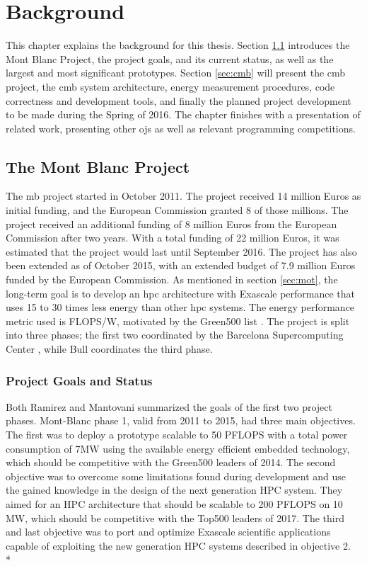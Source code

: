 \chapter{Background}
\label{ch:background}
This chapter explains the background for this thesis. Section \ref{sec:mbp} introduces the Mont Blanc Project, the project goals, and its current status, as well as the largest and most significant prototypes. Section \ref{sec:cmb} will present the \gls{cmb} project, the \gls{cmb} system architecture, energy measurement procedures, code correctness and development tools, and finally the planned project development to be made during the Spring of 2016. The chapter finishes with a presentation of related work, presenting other \gls{ojs} as well as relevant programming competitions.

\section{The Mont Blanc Project}
\label{sec:mbp}
The \gls{mb} project \cite{MB} started in October 2011. The project received 14 million Euros as initial funding, and the European Commission granted 8 of those millions. The project received an additional funding of 8 million Euros from the European Commission after two years. With a total funding of 22 million Euros, it was estimated that the project would last until September 2016. The project has also been extended as of October 2015, with an extended budget of 7.9 million Euros funded by the European Commission. As mentioned in section \ref{sec:mot}, the long-term goal is to develop an \gls{hpc} architecture with Exascale performance that uses 15 to 30 times less energy than other \gls{hpc} systems. The energy performance metric used is FLOPS/W, motivated by the Green500 list \cite{GREEN500}. The project is split into three phases; the first two coordinated by the Barcelona Supercomputing Center \cite{BSC}, while Bull \cite{BULL} coordinates the third phase.

\subsection{Project Goals and Status}
Both Ramirez \cite{p:MB-PRACE-14} and Mantovani \cite{p:MB-15} summarized the goals of the first two project phases. Mont-Blanc phase 1, valid from 2011 to 2015, had three main objectives. The first was to deploy a prototype scalable to 50 PFLOPS with a total power consumption of 7MW using the available energy efficient embedded technology, which should be competitive with the Green500 leaders of 2014. The second objective was to overcome some limitations found during development and use the gained knowledge in the design of the next generation HPC system. They aimed for an HPC architecture that should be scalable to 200 PFLOPS on 10 MW, which should be competitive with the Top500 leaders of 2017. The third and last objective was to port and optimize Exascale scientific applications capable of exploiting the new generation HPC systems described in objective 2. \\*

